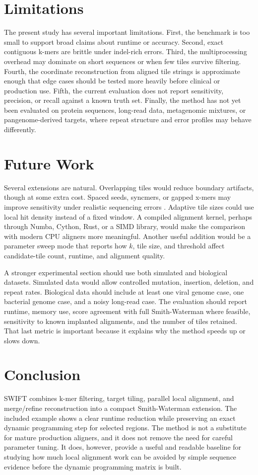 \documentclass[11pt]{article}
\begin{document}
\section{Limitations}
The present study has several important limitations. First, the benchmark is too small to support broad claims about runtime or accuracy. Second, exact contiguous k-mers are brittle under indel-rich errors. Third, the multiprocessing overhead may dominate on short sequences or when few tiles survive filtering. Fourth, the coordinate reconstruction from aligned tile strings is approximate enough that edge cases should be tested more heavily before clinical or production use. Fifth, the current evaluation does not report sensitivity, precision, or recall against a known truth set. Finally, the method has not yet been evaluated on protein sequences, long-read data, metagenomic mixtures, or pangenome-derived targets, where repeat structure and error profiles may behave differently.

\section{Future Work}
Several extensions are natural. Overlapping tiles would reduce boundary artifacts, though at some extra cost. Spaced seeds, syncmers, or gapped x-mers may improve sensitivity under realistic sequencing errors \citep{gaston2025xmapper,hoang2024masked_minimizer,shaw2022local_kmer_selection}. Adaptive tile sizes could use local hit density instead of a fixed window. A compiled alignment kernel, perhaps through Numba, Cython, Rust, or a SIMD library, would make the comparison with modern CPU aligners more meaningful. Another useful addition would be a parameter sweep mode that reports how $k$, tile size, and threshold affect candidate-tile count, runtime, and alignment quality.

A stronger experimental section should use both simulated and biological datasets. Simulated data would allow controlled mutation, insertion, deletion, and repeat rates. Biological data should include at least one viral genome case, one bacterial genome case, and a noisy long-read case. The evaluation should report runtime, memory use, score agreement with full Smith-Waterman where feasible, sensitivity to known implanted alignments, and the number of tiles retained. That last metric is important because it explains why the method speeds up or slows down.

\section{Conclusion}
SWIFT combines k-mer filtering, target tiling, parallel local alignment, and merge/refine reconstruction into a compact Smith-Waterman extension. The included example shows a clear runtime reduction while preserving an exact dynamic programming step for selected regions. The method is not a substitute for mature production aligners, and it does not remove the need for careful parameter tuning. It does, however, provide a useful and readable baseline for studying how much local alignment work can be avoided by simple sequence evidence before the dynamic programming matrix is built.
\end{document}

